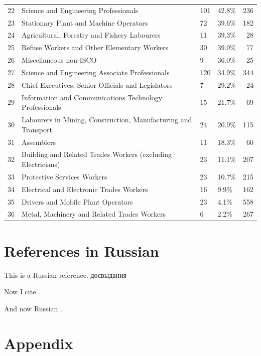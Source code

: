 \documentclass[12pt,a4paper]{article}
\numberwithin{equation}{section}
\begin{document}
{\begin{table}[ht]
\begin{small}
\begin{tabular}{rp{8cm}llr}
  22 & Science and Engineering Professionals & 101 & 42.8\% & 236 \\ 
  23 & Stationary Plant and Machine Operators & 72 & 39.6\% & 182 \\ 
  24 & Agricultural, Forestry and Fishery Labourers & 11 & 39.3\% &  28 \\ 
  25 & Refuse Workers and Other Elementary Workers & 30 & 39.0\% &  77 \\ 
  26 & Miscellaneous non-ISCO & 9 & 36.0\% &  25 \\ 
  27 & Science and Engineering Associate Professionals & 120 & 34.9\% & 344 \\ 
  28 & Chief Executives, Senior Officials and Legislators & 7 & 29.2\% &  24 \\ 
  29 & Information and Communications Technology Professionals & 15 & 21.7\% &  69 \\ 
  30 & Labourers in Mining, Construction, Manufacturing and Transport & 24 & 20.9\% & 115 \\ 
  31 & Assemblers & 11 & 18.3\% &  60 \\ 
  32 & Building and Related Trades Workers (excluding Electricians) & 23 & 11.1\% & 207 \\ 
  33 & Protective Services Workers & 23 & 10.7\% & 215 \\ 
  34 & Electrical and Electronic Trades Workers & 16 & 9.9\% & 162 \\ 
  35 & Drivers and Mobile Plant Operators & 23 & 4.1\% & 558 \\ 
  36 & Metal, Machinery and Related Trades Workers & 6 & 2.2\% & 267 \\ 
   \hline
\end{tabular}
\end{small}
\end{table}


\section*{References in Russian}

 This is a Russian reference. \foreignlanguage{russian}{досвыдания}

Now I cite \parencite{carnoy_005._2012}. 

And now Russian
\parencite{andrushak2010}. 

\printbibliography


\newpage
\section*{Appendix}

}
\end{document}
